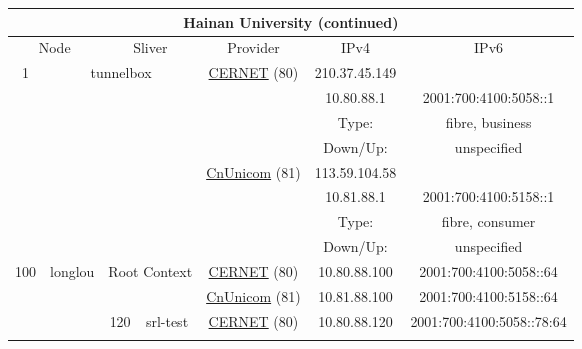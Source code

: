 \begin{small}
\begin{center}
\begin{longtable}{|c|c|c|c|c|c|c|c|}
\endfirsthead
\hline
 \multicolumn{8}{|c|}{\textbf{Hainan University (continued)}} \\ \hline
 \multicolumn{2}{|p{8em}|}{Node} & \multicolumn{2}{|p{8em}|}{Sliver} & \multicolumn{2}{|p{8em}|}{Provider} & IPv4 & IPv6 \\ \hline
\endhead
 \multirow{8}{*}{\tiny{1}} & \multicolumn{3}{|c|}{\multirow{8}{*}{\tiny{tunnelbox}}} & \multicolumn{2}{|c|}{\multirow{4}{*}{\tiny{\href{http://www.cernet.edu.cn}{CERNET} (80)}}} & \tiny{210.37.45.149} & \frownie{} \\* \cline{7-7}\cline{8-8}
  & \multicolumn{3}{|c|}{} & \multicolumn{2}{|c|}{} & \tiny{10.80.88.1} & \tiny{2001:700:4100:5058::1} \\* \cline{7-7}\cline{8-8}
  & \multicolumn{3}{|c|}{} & \multicolumn{2}{|c|}{} & Type: & fibre, business \\* \cline{7-7}\cline{8-8}
  & \multicolumn{3}{|c|}{} & \multicolumn{2}{|c|}{} & Down/Up:  & unspecified \\* \cline{5-5}\cline{6-6}\cline{7-7}\cline{8-8}
  & \multicolumn{3}{|c|}{} & \multicolumn{2}{|c|}{\multirow{4}{*}{\tiny{\href{http://www.chinaunicom.com}{CnUnicom} (81)}}} & \tiny{113.59.104.58} & \frownie{} \\* \cline{7-7}\cline{8-8}
  & \multicolumn{3}{|c|}{} & \multicolumn{2}{|c|}{} & \tiny{10.81.88.1} & \tiny{2001:700:4100:5158::1} \\* \cline{7-7}\cline{8-8}
  & \multicolumn{3}{|c|}{} & \multicolumn{2}{|c|}{} & Type: & fibre, consumer \\* \cline{7-7}\cline{8-8}
  & \multicolumn{3}{|c|}{} & \multicolumn{2}{|c|}{} & Down/Up:  & unspecified \\ \hline
 \multirow{24}{*}{\tiny{100}} & \multicolumn{1}{|l|}{\multirow{24}{*}{\tiny{longlou}}} & \multicolumn{2}{|c|}{\multirow{2}{*}{\tiny{Root Context}}} & \multicolumn{2}{|c|}{\tiny{\href{http://www.cernet.edu.cn}{CERNET} (80)}} & \tiny{10.80.88.100} & \tiny{2001:700:4100:5058::64} \\* \cline{5-5}\cline{6-6}\cline{7-7}\cline{8-8}
  &  & \multicolumn{2}{|c|}{} & \multicolumn{2}{|c|}{\tiny{\href{http://www.chinaunicom.com}{CnUnicom} (81)}} & \tiny{10.81.88.100} & \tiny{2001:700:4100:5158::64} \\* \cline{3-3}\cline{4-4}\cline{5-5}\cline{6-6}\cline{7-7}\cline{8-8}
  &  & \multirow{2}{*}{\tiny{120}} & \multicolumn{1}{|l|}{\multirow{2}{*}{\tiny{srl-test}}} & \multicolumn{2}{|c|}{\tiny{\href{http://www.cernet.edu.cn}{CERNET} (80)}} & \tiny{10.80.88.120} & \tiny{2001:700:4100:5058::78:64} \\* \cline{5-5}\cline{6-6}\cline{7-7}\cline{8-8}

\end{longtable}
\end{center}
\end{small}
